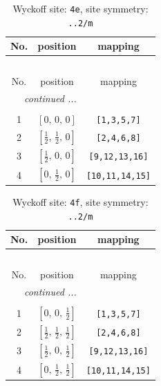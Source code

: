 \documentclass[fleqn,8pt]{jsarticle}
\begin{document}
\begin{longtable}{ccc}
\caption{Wyckoff site: {\tt 4e}, site symmetry: {\tt ..2/m}}
 \\
 \hline \hline
No. & position & mapping \\ \hline \endfirsthead

\multicolumn{2}{l}{\tablename\ \thetable{}} \\
 \hline \hline
No. & position & mapping \\ \hline \endhead

 \hline \hline
\multicolumn{2}{r}{\footnotesize\it continued ...} \\ \endfoot

 \hline \hline
\multicolumn{2}{r}{} \\ \endlastfoot

1 & $\left[ 0,\, 0,\, 0 \right]$ & {\tt [1,3,5,7]} \\ \hline
2 & $\left[ \frac{1}{2},\, \frac{1}{2},\, 0 \right]$ & {\tt [2,4,6,8]} \\ \hline
3 & $\left[ \frac{1}{2},\, 0,\, 0 \right]$ & {\tt [9,12,13,16]} \\ \hline
4 & $\left[ 0,\, \frac{1}{2},\, 0 \right]$ & {\tt [10,11,14,15]} \\
\end{longtable}
\renewcommand{\arraystretch}{1.2}
\begin{longtable}{ccc}
\caption{Wyckoff site: {\tt 4f}, site symmetry: {\tt ..2/m}}
 \\
 \hline \hline
No. & position & mapping \\ \hline \endfirsthead

\multicolumn{2}{l}{\tablename\ \thetable{}} \\
 \hline \hline
No. & position & mapping \\ \hline \endhead

 \hline \hline
\multicolumn{2}{r}{\footnotesize\it continued ...} \\ \endfoot

 \hline \hline
\multicolumn{2}{r}{} \\ \endlastfoot

1 & $\left[ 0,\, 0,\, \frac{1}{2} \right]$ & {\tt [1,3,5,7]} \\ \hline
2 & $\left[ \frac{1}{2},\, \frac{1}{2},\, \frac{1}{2} \right]$ & {\tt [2,4,6,8]} \\ \hline
3 & $\left[ \frac{1}{2},\, 0,\, \frac{1}{2} \right]$ & {\tt [9,12,13,16]} \\ \hline
4 & $\left[ 0,\, \frac{1}{2},\, \frac{1}{2} \right]$ & {\tt [10,11,14,15]} \\
\end{longtable}
\end{document}
